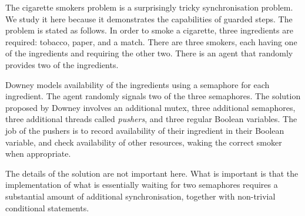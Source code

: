 \begin{example}

The cigarette smokers problem \cite{books/Downey08LBOS} is a surprisingly tricky synchronisation problem.
We study it here because it demonstrates the capabilities of guarded steps.
The problem is stated as follows.
In order to smoke a cigarette, three ingredients are required: tobacco, paper, and a match.
There are three smokers, each having one of the ingredients and requiring the other two.
There is an agent that randomly provides two of the ingredients.

Downey models availability of the ingredients using a semaphore for each ingredient.
The agent randomly signals two of the three semaphores.
%
%
The solution proposed by Downey involves an additional mutex, three additional semaphores, three additional threads called \emph{pushers}, and three regular Boolean variables.
The job of the pushers is to record availability of their ingredient in their Boolean variable, and check availability of other resources, waking the correct smoker when appropriate.

The details of the solution are not important here.
What is important is that the implementation of what is essentially waiting for two semaphores requires a substantial amount of additional synchronisation, together with non-trivial conditional statements.



\end{example}
